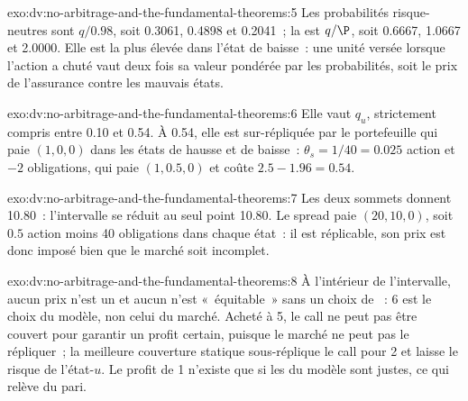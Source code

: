 \begin{solution}{exo:dv:no-arbitrage-and-the-fundamental-theorems:5}
Les probabilités risque-neutres sont $q/0.98$, soit 0.3061, 0.4898 et 0.2041~;
la  est $q/\P$, soit 0.6667, 1.0667 et 2.0000. Elle est la plus élevée dans l'état de baisse~: une unité versée lorsque
l'action a chuté vaut deux fois sa valeur pondérée par les probabilités, soit le prix
de l'assurance contre les mauvais états.
\end{solution}

\begin{solution}{exo:dv:no-arbitrage-and-the-fundamental-theorems:6}
Elle vaut $q_u$, strictement compris entre 0.10 et 0.54. À 0.54, elle est sur-répliquée
par le portefeuille qui paie $(1,0,0)$ dans les états de hausse et de baisse~: $\theta_s=1/40=0.025$
action et $-2$ obligations, qui paie $(1,0.5,0)$ et coûte $2.5-1.96=0.54$.
\end{solution}

\begin{solution}{exo:dv:no-arbitrage-and-the-fundamental-theorems:7}
Les deux sommets donnent 10.80~: l'intervalle se réduit au seul point 10.80. Le spread paie
$(20,10,0)$, soit $0.5$ action moins 40 obligations dans chaque état~: il est réplicable,
son prix est donc imposé bien que le marché soit incomplet.
\end{solution}

\begin{solution}{exo:dv:no-arbitrage-and-the-fundamental-theorems:8}
À l'intérieur de l'intervalle, aucun prix n'est un  et aucun n'est «~équitable~» sans un
choix de ~: 6 est le choix du modèle, non celui du marché. Acheté à 5, le
call ne peut pas être couvert pour garantir un profit certain, puisque le marché ne peut pas le répliquer~; la
meilleure couverture statique sous-réplique le call pour 2 et laisse le risque de l'état-$u$. Le profit
de 1 n'existe que si les  du modèle sont justes, ce qui relève du pari.
\end{solution}

